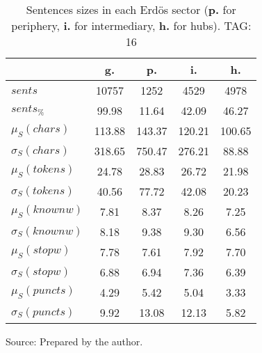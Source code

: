 \begin{table}[h!]
\begin{center}
	\caption{Sentences sizes in each Erd\"os sector ({{\bf p.}} for periphery, {{\bf i.}} for intermediary, {{\bf h.}} for hubs). TAG: 16}\label{tab:sizesSents}
\begin{tabular}{| l || c | c | c | c |}\hline
 & {\bf g.} & {\bf p.} & {\bf i.} & {\bf h.} \\\hline\hline
$sents$ & 10757  & 1252  & 4529  & 4978 \\
$sents_{\%}$ & 99.98  & 11.64  & 42.09  & 46.27 \\\hline
$\mu_S(chars)$ & 113.88  & 143.37  & 120.21  & 100.65 \\
$\sigma_S(chars)$ & 318.65  & 750.47  & 276.21  & 88.88 \\\hline
$\mu_S(tokens)$ & 24.78  & 28.83  & 26.72  & 21.98 \\
$\sigma_S(tokens)$ & 40.56  & 77.72  & 42.08  & 20.23 \\\hline
$\mu_S(knownw)$ & 7.81  & 8.37  & 8.26  & 7.25 \\
$\sigma_S(knownw)$ & 8.18  & 9.38  & 9.30  & 6.56 \\\hline
$\mu_S(stopw)$ & 7.78  & 7.61  & 7.92  & 7.70 \\
$\sigma_S(stopw)$ & 6.88  & 6.94  & 7.36  & 6.39 \\\hline
$\mu_S(puncts)$ & 4.29  & 5.42  & 5.04  & 3.33 \\
$\sigma_S(puncts)$ & 9.92  & 13.08  & 12.13  & 5.82 \\\hline
\end{tabular}
\begin{flushleft}
		Source: Prepared by the author.\
\end{flushleft}
\end{center}
\end{table}
